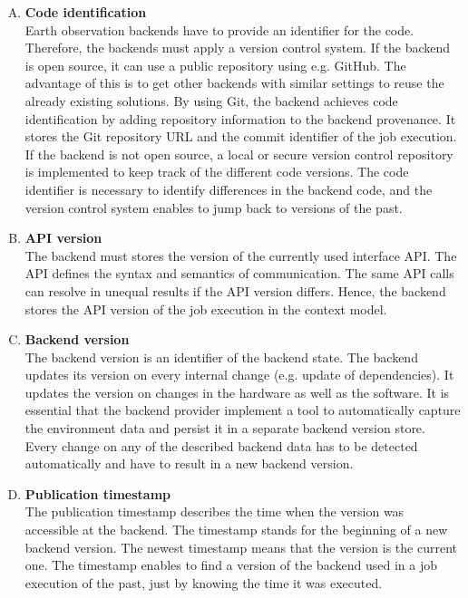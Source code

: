 \documentclass[draft,final]{vutinfth} %
\begin{document}
\begin{enumerate}[(A)]
	\item \textbf{Code identification} \\
	Earth observation backends have to provide an identifier for the code. Therefore, the backends must apply a version control system. If the backend is open source, it can use a public repository using e.g. GitHub. The advantage of this is to get other backends with similar settings to reuse the already existing solutions. By using Git, the backend achieves code identification by adding repository information to the backend provenance. It stores the Git repository URL and the commit identifier of the job execution. If the backend is not open source, a local or secure version control repository is implemented to keep track of the different code versions. The code identifier is necessary to identify differences in the backend code, and the version control system enables to jump back to versions of the past.  
	\item \textbf{API version} \\
	The backend must stores the version of the currently used interface API. The API defines the syntax and semantics of communication. The same API calls can resolve in unequal results if the API version differs. Hence, the backend stores the API version of the job execution in the context model.
	\item \textbf{Backend version} \\
	The backend version is an identifier of the backend state. The backend updates its version on every internal change (e.g. update of dependencies). It updates the version on changes in the hardware as well as the software. It is essential that the backend provider implement a tool to automatically capture the environment data and persist it in a separate backend version store. Every change on any of the described backend data has to be detected automatically and have to result in a new backend version.   
	\item \textbf{Publication timestamp} \\
	The publication timestamp describes the time when the version was accessible at the backend. The timestamp stands for the beginning of a new backend version. The newest timestamp means that the version is the current one. The timestamp enables to find a version of the backend used in a job execution of the past, just by knowing the time it was executed.    
\end{enumerate}
\end{document}
